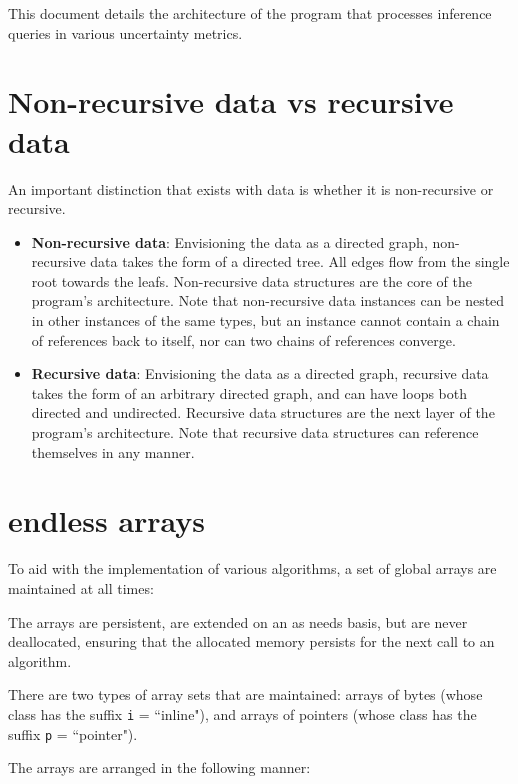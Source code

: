 \documentclass{article}
\begin{document}
This document details the architecture of the program that processes inference queries in various uncertainty metrics.

\section{Non-recursive data vs recursive data}

An important distinction that exists with data is whether it is non-recursive or recursive. 

\begin{itemize}
\item \textbf{Non-recursive data}: Envisioning the data as a directed graph, non-recursive data takes the form of a directed tree. All edges flow from the single root towards the leafs. Non-recursive data structures are the core of the program's architecture. Note that non-recursive data instances can be nested in other instances of the same types, but an instance cannot contain a chain of references back to itself, nor can two chains of references converge.
\item \textbf{Recursive data}: Envisioning the data as a directed graph, recursive data takes the form of an arbitrary directed graph, and can have loops both directed and undirected. Recursive data structures are the next layer of the program's architecture. Note that recursive data structures can reference themselves in any manner.
\end{itemize}

\section{endless arrays}

To aid with the implementation of various algorithms, a set of global arrays are maintained at all times:

The arrays are persistent, are extended on an as needs basis, but are never deallocated, ensuring that the allocated memory persists for the next call to an algorithm. 

There are two types of array sets that are maintained: arrays of bytes (whose class has the suffix \texttt{i} = ``inline"), and arrays of pointers (whose class has the suffix \texttt{p} = ``pointer").

The arrays are arranged in the following manner:
\end{document}
